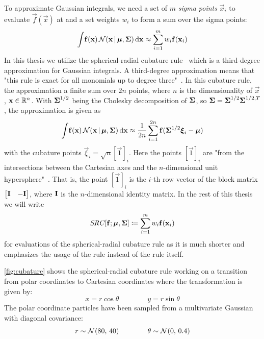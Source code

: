 	To approximate Gaussian integrals, we need a set of \(m\) \emph{sigma points} \( \vec{x}_i \) to evaluate \( \vec{f}(\vec{x}) \) at and a set weights \( w_i \) to form a sum over the sigma points:
	\begin{equation*}
		\int\! \boldsymbol{\mathrm{f}}(\boldsymbol{\mathrm{x}}) \, \mathcal{N}(\boldsymbol{\mathrm{x}} \,\vert\, \boldsymbol{\mathrm{\mu}}, \boldsymbol{\mathrm{\Sigma}}) \dd{\boldsymbol{\mathrm{x}}} \approx \sum_{i = 1}^{m} w_i \boldsymbol{\mathrm{f}}(\boldsymbol{\mathrm{x}}_i)
	\end{equation*}
	In this thesis we utilize the spherical-radial cubature rule~\cite{solinCubatureIntegrationMethods2010} which is a third-degree approximation for Gaussian integrals. A third-degree approximation means that "this rule is exact for all monomials up to degree three"~\cite[p. 18]{solinCubatureIntegrationMethods2010}. In this cubature rule, the approximation a finite sum over \( 2n \) points, where \( n \) is the dimensionality of \(\vec{x}\), \ie \( \boldsymbol{\mathrm{x}} \in \mathbb{R}^n \). With \( \boldsymbol{\mathrm{\Sigma}}^{1/2} \) being the Cholesky decomposition of \( \boldsymbol{\mathrm{\Sigma}} \), so \( \boldsymbol{\mathrm{\Sigma}} = \boldsymbol{\mathrm{\Sigma}}^{1/2} \boldsymbol{\mathrm{\Sigma}}^{1/2, T} \), the approximation is given as
	\begin{equation*}
		\int\! \boldsymbol{\mathrm{f}}(\boldsymbol{\mathrm{x}}) \, \mathcal{N}(\boldsymbol{\mathrm{x}} \,\vert\, \boldsymbol{\mathrm{\mu}}, \boldsymbol{\mathrm{\Sigma}}) \dd{\boldsymbol{\mathrm{x}}} \approx \frac{1}{2n} \sum_{i = 1}^{2n} \boldsymbol{\mathrm{f}}(\boldsymbol{\mathrm{\Sigma}}^{1/2} \boldsymbol{\mathrm{\xi}}_i - \boldsymbol{\mathrm{\mu}})
	\end{equation*}
	with the cubature points \( \vec{\xi}_i = \sqrt{n} [\vec{1}]_i \). Here the points \( [\vec{1}]_i \) are "from the intersections between the Cartesian axes and the \(n\)-dimensional unit hypersphere"~\cite{solinCubatureIntegrationMethods2010}. That is, the point \( [\vec{1}]_i \) is the \(i\)-th row vector of the block matrix \( \begin{bmatrix} \boldsymbol{\mathrm{I}} & -\boldsymbol{\mathrm{I}} \end{bmatrix} \), where \( \boldsymbol{\mathrm{I}} \) is the \(n\)-dimensional identity matrix. In the rest of this thesis we will write
	\begin{equation*}
		\mathit{SRC}[\boldsymbol{\mathrm{f}}; \boldsymbol{\mathrm{\mu}}, \boldsymbol{\mathrm{\Sigma}}] \coloneqq \sum_{i = 1}^{m} w_i \boldsymbol{\mathrm{f}}(\boldsymbol{\mathrm{x}}_i)
	\end{equation*}
	for evaluations of the spherical-radial cubature rule as it is much shorter and emphasizes the usage of the rule instead of the rule itself.

	\autoref{fig:cubature} shows the spherical-radial cubature rule working on a transition from polar coordinates to Cartesian coordinates where the transformation is given by:
	\begin{equation*}
		x = r \cos\theta \qquad\qquad y = r \sin\theta
	\end{equation*}
	The polar coordinate particles have been sampled from a multivariate Gaussian with diagonal covariance:
	\begin{equation*}
		r \sim \mathcal{N}(80,\, 40) \qquad\qquad \theta \sim \mathcal{N}(0,\, 0.4)
	\end{equation*}

